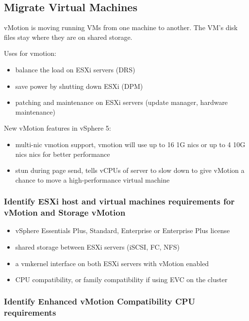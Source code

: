 \subsection{Migrate Virtual Machines}

vMotion is moving running VMs from one machine to another. The VM's disk files
stay where they are on shared storage.

Uses for vmotion:

\begin{itemize}
\item balance the load on ESXi servers (DRS)
\item save power by shutting down ESXi (DPM)
\item patching and maintenance on ESXi servers (update manager, hardware
maintenance)
\end{itemize}

New vMotion features in vSphere 5:

\begin{itemize}

\item multi-nic vmotion support, vmotion will use up to 16 1G nics or up to 4
10G nics nics for better performance

\item stun during page send, tells vCPUs of server to slow down to give
vMotion a chance to move a high-performance virtual machine

\end{itemize}

\subsubsection{Identify ESXi host and virtual machines requirements for vMotion and Storage vMotion}

\begin{itemize}
\item vSphere Essentials Plus, Standard, Enterprise or Enterprise Plus license
\item shared storage between ESXi servers (iSCSI, FC, NFS)
\item a vmkernel interface on both ESXi servers with vMotion enabled
\item CPU compatibility, or family compatibility if using EVC on the cluster
\end{itemize}

\subsubsection{Identify Enhanced vMotion Compatibility CPU requirements}

